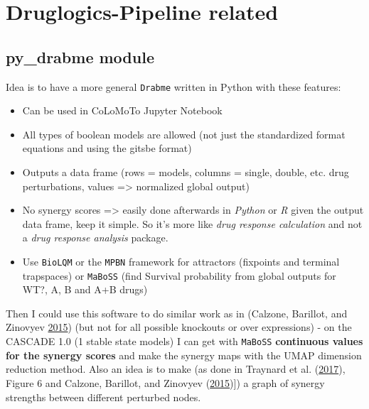 \documentclass[
  12pt,
]{book}
\providecommand{\tightlist}{%
  \setlength{\itemsep}{0pt}\setlength{\parskip}{0pt}}
\begin{document}
\hypertarget{druglogics-pipeline-related}{%
\section*{Druglogics-Pipeline related}\label{druglogics-pipeline-related}}

\hypertarget{py_drabme-module}{%
\subsection*{py\_drabme module}\label{py_drabme-module}}

Idea is to have a more general \texttt{Drabme} written in Python with these features:

\begin{itemize}
\tightlist
\item
  Can be used in CoLoMoTo Jupyter Notebook
\item
  All types of boolean models are allowed (not just the standardized format equations and using the gitsbe format)
\item
  Outputs a data frame (rows = models, columns = single, double, etc. drug perturbations, values =\textgreater{} normalized global output)
\item
  No synergy scores =\textgreater{} easily done afterwards in \emph{Python} or \emph{R} given the output data frame, keep it simple.
  So it's more like \emph{drug response calculation} and not a \emph{drug response analysis} package.
\item
  Use \texttt{BioLQM} or the \texttt{MPBN} framework for attractors (fixpoints and terminal trapspaces) or \texttt{MaBoSS} (find Survival probability from global outputs for WT?, A, B and A+B drugs)
\end{itemize}

Then I could use this software to do similar work as in (Calzone, Barillot, and Zinovyev \protect\hyperlink{ref-Calzone2015}{2015}) (but not for all possible knockouts or over expressions) - on the CASCADE 1.0 (1 stable state models) I can get with \texttt{MaBoSS} \textbf{continuous values for the synergy scores} and make the synergy maps with the UMAP dimension reduction method.
Also an idea is to make (as done in Traynard et al. (\protect\hyperlink{ref-Traynard2017}{2017}), Figure 6 and Calzone, Barillot, and Zinovyev (\protect\hyperlink{ref-Calzone2015}{2015}){]}) a graph of synergy strengths between different perturbed nodes.
\end{document}
